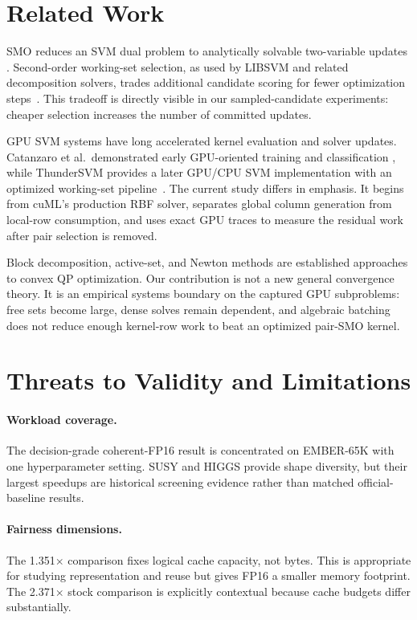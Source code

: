 \section{Related Work}

SMO reduces an SVM dual problem to analytically solvable two-variable updates
\cite{platt1999smo}. Second-order working-set selection, as used by LIBSVM and
related decomposition solvers, trades additional candidate scoring for fewer
optimization steps~\cite{fan2005working,chang2011libsvm}. This tradeoff is
directly visible in our sampled-candidate experiments: cheaper selection
increases the number of committed updates.

GPU SVM systems have long accelerated kernel evaluation and solver updates.
Catanzaro et al.\ demonstrated early GPU-oriented training and classification
\cite{catanzaro2008gpu}, while ThunderSVM provides a later GPU/CPU SVM
implementation with an optimized working-set pipeline~\cite{wenthundersvm}.
The current study differs in emphasis. It begins from cuML's production RBF
solver, separates global column generation from local-row consumption, and
uses exact GPU traces to measure the residual work after pair selection is
removed.

Block decomposition, active-set, and Newton methods are established approaches
to convex QP optimization. Our contribution is not a new general convergence
theory. It is an empirical systems boundary on the captured GPU subproblems:
free sets become large, dense solves remain dependent, and algebraic batching
does not reduce enough kernel-row work to beat an optimized pair-SMO kernel.

\section{Threats to Validity and Limitations}

\paragraph{Workload coverage.}
The decision-grade coherent-FP16 result is concentrated on EMBER-65K with one
hyperparameter setting. SUSY and HIGGS provide shape diversity, but their
largest speedups are historical screening evidence rather than matched
official-baseline results.

\paragraph{Fairness dimensions.}
The 1.351$\times$ comparison fixes logical cache capacity, not bytes. This is
appropriate for studying representation and reuse but gives FP16 a smaller
memory footprint. The 2.371$\times$ stock comparison is explicitly contextual
because cache budgets differ substantially.

